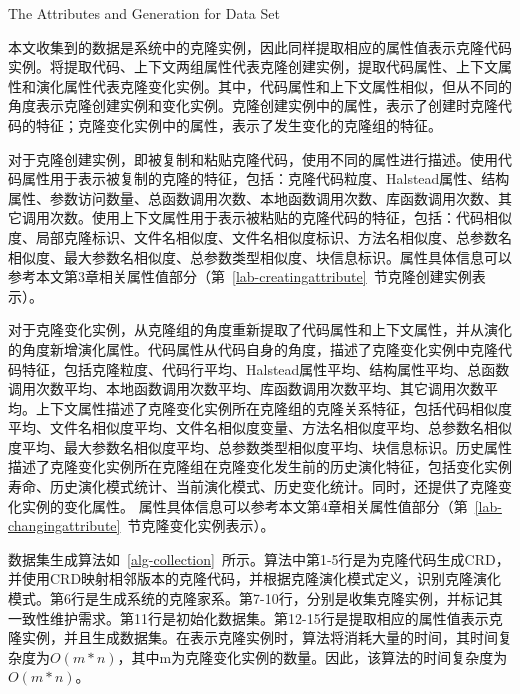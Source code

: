 {The Attributes and Generation for Data Set}

本文收集到的数据是系统中的克隆实例，因此同样提取相应的属性值表示克隆代码实例。将提取代码、上下文两组属性代表克隆创建实例，提取代码属性、上下文属性和演化属性代表克隆变化实例。其中，代码属性和上下文属性相似，但从不同的角度表示克隆创建实例和变化实例。克隆创建实例中的属性，表示了创建时克隆代码的特征；克隆变化实例中的属性，表示了发生变化的克隆组的特征。

对于克隆创建实例，即被复制和粘贴克隆代码，使用不同的属性进行描述。使用代码属性用于表示被复制的克隆的特征，包括：克隆代码粒度、Halstead属性、结构属性、参数访问数量、总函数调用次数、本地函数调用次数、库函数调用次数、其它调用次数。使用上下文属性用于表示被粘贴的克隆代码的特征，包括：代码相似度、局部克隆标识、文件名相似度、文件名相似度标识、方法名相似度、总参数名相似度、最大参数名相似度、总参数类型相似度、块信息标识。属性具体信息可以参考本文第3章相关属性值部分（第~\ref{lab-creatingattribute}~节克隆创建实例表示）。

对于克隆变化实例，从克隆组的角度重新提取了代码属性和上下文属性，并从演化的角度新增演化属性。代码属性从代码自身的角度，描述了克隆变化实例中克隆代码特征，包括克隆粒度、代码行平均、Halstead属性平均、结构属性平均、总函数调用次数平均、本地函数调用次数平均、库函数调用次数平均、其它调用次数平均。上下文属性描述了克隆变化实例所在克隆组的克隆关系特征，包括代码相似度平均、文件名相似度平均、文件名相似度变量、方法名相似度平均、总参数名相似度平均、最大参数名相似度平均、总参数类型相似度平均、块信息标识。历史属性描述了克隆变化实例所在克隆组在克隆变化发生前的历史演化特征，包括变化实例寿命、历史演化模式统计、当前演化模式、历史变化统计。同时，还提供了克隆变化实例的变化属性。
属性具体信息可以参考本文第4章相关属性值部分（第~\ref{lab-changingattribute}~节克隆变化实例表示）。

数据集生成算法如~\ref{alg-collection}~所示。算法中第1-5行是为克隆代码生成CRD，并使用CRD映射相邻版本的克隆代码，并根据克隆演化模式定义，识别克隆演化模式。第6行是生成系统的克隆家系。第7-10行，分别是收集克隆实例，并标记其一致性维护需求。第11行是初始化数据集。第12-15行是提取相应的属性值表示克隆实例，并且生成数据集。在表示克隆实例时，算法将消耗大量的时间，其时间复杂度为$O(m*n)$，其中m为克隆变化实例的数量。因此，该算法的时间复杂度为$O(m*n)$。

